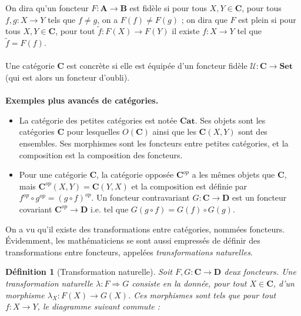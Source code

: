 \documentclass[11pt,a4paper]{article}
\newtheorem{defi}[theo]{Définition}
\newcommand{\gr}{\textbf}
\newcommand{\il}{\textit}
\newcommand{\U}{\mathcal{U}}
\begin{document}
On dira qu'un foncteur $F : \gr{A} \to \gr{B}$ est fidèle si pour tous $X,Y \in \gr{C}$, pour tous $f,g : X \to Y$ tels que $f \neq g$, on a $F(f) \neq F(g)$ ; on dira que $F$ est plein si pour tous $X,Y \in \gr{C}$, pour tout $\tilde{f} : F(X) \to F(Y)$ il existe $f : X \to Y$ tel que $\tilde{f} = F(f)$.\\\\
Une catégorie $\gr{C}$ est concrète si elle est équipée d'un foncteur fidèle $\U : \gr{C} \to \gr{Set}$ (qui est alors un foncteur d'oubli).\\\\
\gr{Exemples plus avancés de catégories.}
\begin{itemize}
\item La catégorie des petites catégories est notée $\gr{Cat}$. Ses objets sont les catégories $\gr{C}$ pour lesquelles $O(\gr{C})$ ainsi que les $\gr{C}(X,Y)$ sont des ensembles. Ses morphismes sont les foncteurs entre petites catégories, et la composition est la composition des foncteurs.
\item Pour une catégorie $\gr{C}$, la catégorie opposée $\gr{C}^{op}$ a les mêmes objets que $\gr{C}$, mais $\gr{C}^{op}(X,Y) = \gr{C}(Y,X)$ et la composition est définie par $f^{op} \circ g^{op} = (g \circ f)^{op}$. Un foncteur contravariant $G : \gr{C} \to \gr{D}$ est un foncteur covariant $\gr{C}^{op} \to \gr{D}$ i.e. tel que $G(g \circ f) = G(f) \circ G(g)$.
\end{itemize}
On a vu qu'il existe des transformations entre catégories, nommées foncteurs. \'Evidemment, les mathématiciens se sont aussi empressés de définir des transformations entre foncteurs, appelées \il{transformations naturelles}.
\begin{defi}[Transformation naturelle]
Soit $F,G : \gr{C} \to \gr{D}$ deux foncteurs. Une transformation naturelle $\lambda : F \Rightarrow G$ consiste en la donnée, pour tout $X \in \gr{C}$, d'un morphisme $\lambda_X : F(X) \to G(X)$. Ces morphismes sont tels que pour tout $f : X \to Y$, le diagramme suivant commute :
\begin{center}
\end{center}
\end{defi}
\end{document}
